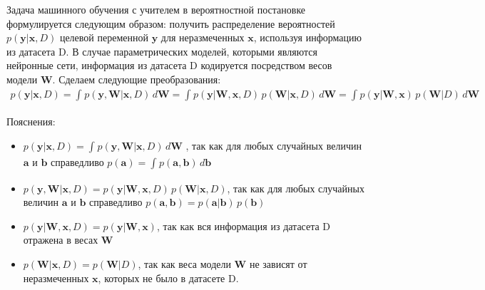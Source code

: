 \documentclass{article}
\numberwithin{equation}{section}
\begin{document}
    Задача машинного обучения с учителем
    в вероятностной постановке формулируется следующим образом: получить
    распределение вероятностей $p(\pmb{y} | \pmb{x}, D)$
    целевой переменной $\pmb{y}$
    для неразмеченных $\pmb{x}$, используя информацию из датасета D.
    В случае параметрических моделей, которыми являются нейронные сети,
    информация из датасета D кодируется посредством весов модели $\pmb{W}$.
    Сделаем следующие преобразования:
    \begin{equation}
    \begin{split}
        p(\pmb{y} | \pmb{x}, D)
        =
        \int_{}{
            p(\pmb{y}, \pmb{W} | \pmb{x}, D)
            \,
            d\pmb{W}
        }
        =
        \int_{}{
            p(\pmb{y} | \pmb{W}, \pmb{x}, D)
            \,
            p(\pmb{W} | \pmb{x}, D)
            \,
            d\pmb{W}
        }
        =
        \int_{}{
            p(\pmb{y} | \pmb{W}, \pmb{x})
            \,
            p(\pmb{W} | D)
            \,
            d\pmb{W}
        }
    \end{split}
    \end{equation}

    Пояснения:
    \begin{itemize}
    \item
        $
            p(\pmb{y} | \pmb{x}, D)
            =
            \int_{}{
                p(\pmb{y}, \pmb{W} | \pmb{x}, D)
                \,
                d\pmb{W}
            }
        $
        , так как для любых случайных величин
        $\pmb{a}$ и $\pmb{b}$ справедливо
        $
            p(\pmb{a})
            =
            \int_{}{
                p(\pmb{a}, \pmb{b})
                \,
                d\pmb{b}
            }
        $
    \item
        $
            p(\pmb{y}, \pmb{W} | \pmb{x}, D)
            =
            p(\pmb{y} | \pmb{W}, \pmb{x}, D)
            \,
            p(\pmb{W} | \pmb{x}, D)
        $, так как для любых случайных величин $\pmb{a}$ и $\pmb{b}$ справедливо
        $
            p(\pmb{a}, \pmb{b})
            =
            p(\pmb{a}| \pmb{b})
            \,
            p(\pmb{b})
        $
    \item
        $
            p(\pmb{y} | \pmb{W}, \pmb{x}, D)
            =
            p(\pmb{y} | \pmb{W}, \pmb{x})
        $, так как вся информация из датасета D отражена в весах $\pmb{W}$
    \item
        $
            p(\pmb{W} | \pmb{x}, D)
            =
            p(\pmb{W} | D)
        $, так как веса модели $\pmb{W}$ не зависят от неразмеченных
        $\pmb{x}$, которых не было в датасете D.
    \end{itemize}
\end{document}
